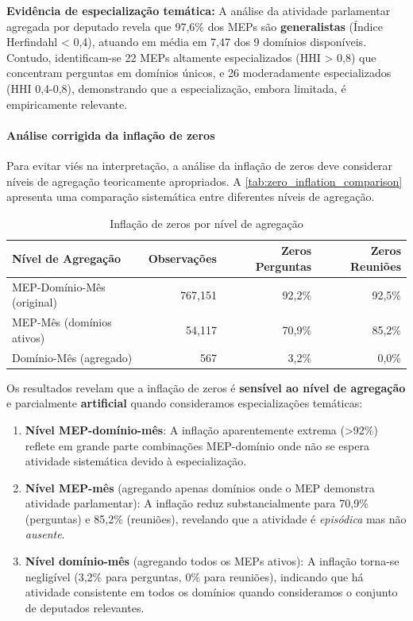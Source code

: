 \textbf{Evidência de especialização temática:} A análise da atividade parlamentar agregada por deputado revela que 97,6\% dos MEPs são \textbf{generalistas} (Índice Herfindahl < 0,4), atuando em média em 7,47 dos 9 domínios disponíveis. Contudo, identificam-se 22 MEPs altamente especializados (HHI > 0,8) que concentram perguntas em domínios únicos, e 26 moderadamente especializados (HHI 0,4-0,8), demonstrando que a especialização, embora limitada, é empiricamente relevante.

\paragraph{Análise corrigida da inflação de zeros}

Para evitar viés na interpretação, a análise da inflação de zeros deve considerar níveis de agregação teoricamente apropriados. A \autoref{tab:zero_inflation_comparison} apresenta uma comparação sistemática entre diferentes níveis de agregação.

\begin{table}[htbp]
\centering
\caption{Inflação de zeros por nível de agregação}
\label{tab:zero_inflation_comparison}
\begin{tabular}{lrrr}
\toprule
\textbf{Nível de Agregação} & \textbf{Observações} & \textbf{Zeros Perguntas} & \textbf{Zeros Reuniões} \\
\midrule
MEP-Domínio-Mês (original) & 767{,}151 & 92{,}2\% & 92{,}5\% \\
MEP-Mês (domínios ativos) & 54{,}117 & 70{,}9\% & 85{,}2\% \\
Domínio-Mês (agregado) & 567 & 3{,}2\% & 0{,}0\% \\
\bottomrule
\end{tabular}
\end{table}

Os resultados revelam que a inflação de zeros é \textbf{sensível ao nível de agregação} e parcialmente \textbf{artificial} quando consideramos especializações temáticas:

\begin{enumerate}
    \item \textbf{Nível MEP-domínio-mês}: A inflação aparentemente extrema (>92\%) reflete em grande parte combinações MEP-domínio onde não se espera atividade sistemática devido à especialização.
    
    \item \textbf{Nível MEP-mês} (agregando apenas domínios onde o MEP demonstra atividade parlamentar): A inflação reduz substancialmente para 70,9\% (perguntas) e 85,2\% (reuniões), revelando que a atividade é \textit{episódica} mas não \textit{ausente}.
    
    \item \textbf{Nível domínio-mês} (agregando todos os MEPs ativos): A inflação torna-se negligível (3,2\% para perguntas, 0\% para reuniões), indicando que há atividade consistente em todos os domínios quando consideramos o conjunto de deputados relevantes.
\end{enumerate}

